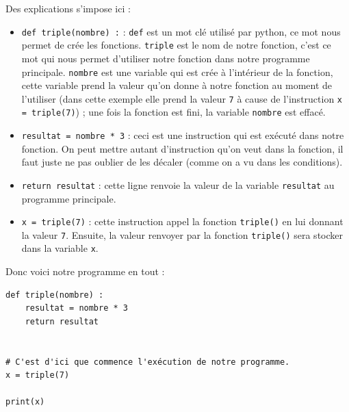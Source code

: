 \documentclass[12pt]{article}
\newcommand{\code}[1]{\colorbox{light-gray}{\texttt{#1}}}
\begin{document}
            Des explications s'impose ici :
            \begin{itemize}
                \item \code{def triple(nombre) :} : \code{def} est un mot clé utilisé par python, ce mot nous
                    permet de crée les fonctions. \code{triple} est le nom de notre fonction, c'est ce
                    mot qui nous permet d'utiliser notre fonction dans notre programme principale. \code{nombre}
                    est une variable qui est crée à l'intérieur de la fonction, cette variable prend la valeur qu'on
                    donne à notre fonction au moment de l'utiliser (dans cette exemple elle prend la valeur \code{7}
                    à cause de l'instruction \code{x = triple(7)}) ; une fois la fonction est fini, la variable
                    \code{nombre} est effacé.

                \item \code{resultat = nombre * 3} : ceci est une instruction qui est exécuté dans notre fonction.
                    On peut mettre autant d'instruction qu'on veut dans la fonction, il faut juste ne pas oublier de
                    les décaler (comme on a vu dans les conditions).
                \item \code{return resultat} : cette ligne renvoie la valeur de la variable \code{resultat} au
                    programme principale.
                \item \code{x = triple(7)} : cette instruction appel la fonction \code{triple()} en lui donnant la
                    valeur \code{7}. Ensuite, la valeur renvoyer par la fonction \code{triple()} sera stocker dans
                    la variable \code{x}.
            \end{itemize}

            Donc voici notre programme en tout :
            \begin{lstlisting}[style=code]
def triple(nombre) :
    resultat = nombre * 3
    return resultat


# C'est d'ici que commence l'exécution de notre programme.
x = triple(7)

print(x)
            \end{lstlisting}

\end{document}
